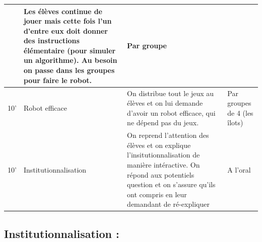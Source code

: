 \documentclass[12pt, a4paper]{article}
\begin{document}
\begin{longtable}{c|m{3.9cm}|m{8.4cm}|m{2.4cm}}
		& 
		
		Les élèves continue de jouer mais cette fois l'un d'entre eux doit donner des instructions élémentaire (pour simuler un algorithme). Au besoin on passe dans les groupes pour faire le robot.
		
		& Par groupe
		
		\\  \hline
		
		10'
		
		&
		
		Robot efficace
		
		&
		
		On distribue tout le jeux au élèves et on lui demande d'avoir un robot efficace, qui ne dépend pas du jeux.
		
		& 
		
		Par groupes de 4 (les îlots)
		
		\\ \hline
		
		10'
		
		&
		
		Institutionnalisation
		
		&
		
		On reprend l'attention des élèves et on explique l'insitutionnalisation de manière intéractive. On répond aux potentiels question et on s'assure qu'ils ont compris en leur demandant de ré-expliquer
		
		&
		
		A l'oral
		
	\end{longtable}
	
\newpage
	
\subsection*{Institutionnalisation :}
	
\end{document}

